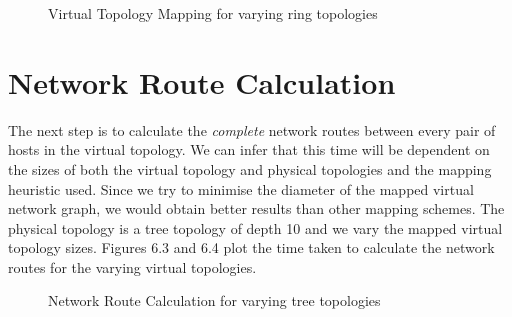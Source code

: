 \begin{figure}
	\noindent
	\caption{Virtual Topology Mapping for varying ring topologies}
\end{figure}

\section{Network Route Calculation}
The next step is to calculate the \emph{complete} network routes between every pair of hosts in the virtual topology. We can infer that this time will be dependent on the sizes of both the virtual topology and physical topologies and the mapping heuristic used. Since we try to minimise the diameter of the mapped virtual network graph, we would obtain better results than other mapping schemes. The physical topology is a tree topology of depth 10 and we vary the mapped virtual topology sizes. Figures 6.3 and 6.4 plot the time taken to calculate the network routes for the varying virtual topologies. 

\begin{figure}
	\noindent
	\caption{Network Route Calculation for varying tree topologies}
\end{figure}

